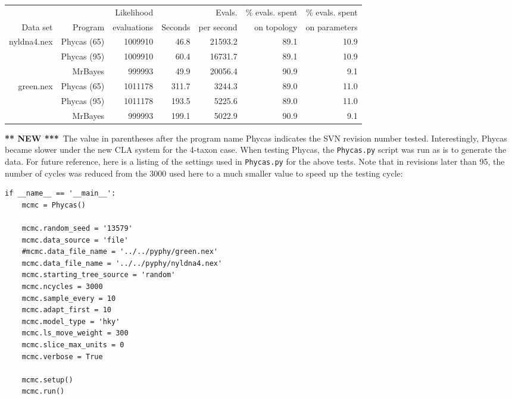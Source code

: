 \documentclass[10pt]{article}
\newcommand{\new}{{\bfseries *** NEW ***}}
\begin{document}
\begin{tabular}{rrrrrrr}
            &             & Likelihood  &            & Evals.      & \% evals. spent & \% evals. spent \\
Data set    & Program     & evaluations &  Seconds   & per second  & on topology     & on parameters   \\ \hline
nyldna4.nex & Phycas (65) &  1009910    &   46.8     & 21593.2     &   89.1          & 10.9            \\
            & Phycas (95) &  1009910    &   60.4     & 16731.7     &   89.1          & 10.9            \\ 
            & MrBayes     &   999993    &   49.9     & 20056.4     &   90.9          &  9.1            \\ \hline
green.nex   & Phycas (65) &  1011178    &  311.7     & 3244.3      &   89.0          & 11.0            \\
            & Phycas (95) &  1011178    &  193.5     & 5225.6      &   89.0          & 11.0            \\
            & MrBayes     &   999993    &  199.1     & 5022.9      &   90.9          &  9.1            \\ \hline
\end{tabular}

\new\ The value in parentheses after the program name Phycas indicates the SVN revision number tested. Interestingly, Phycas became slower under the new CLA system for the 4-taxon case. When testing Phycas, the {\tt Phycas.py} script was run as is to generate the data. For future reference, here is a listing of the settings used in {\tt Phycas.py} for the above tests. Note that in revisions later than 95, the number of cycles was reduced from the 3000 used here to a much smaller value to speed up the testing cycle:

\begin{verbatim}
if __name__ == '__main__':
    mcmc = Phycas()

    mcmc.random_seed = '13579'
    mcmc.data_source = 'file'
    #mcmc.data_file_name = '../../pyphy/green.nex'
    mcmc.data_file_name = '../../pyphy/nyldna4.nex'
    mcmc.starting_tree_source = 'random'
    mcmc.ncycles = 3000
    mcmc.sample_every = 10
    mcmc.adapt_first = 10
    mcmc.model_type = 'hky'
    mcmc.ls_move_weight = 300
    mcmc.slice_max_units = 0
    mcmc.verbose = True

    mcmc.setup()
    mcmc.run()
\end{verbatim}
\end{document}

